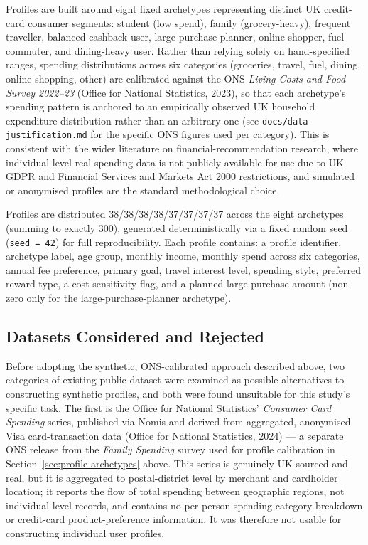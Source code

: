 Profiles are built around eight fixed archetypes representing distinct UK credit-card consumer segments: student (low spend), family (grocery-heavy), frequent traveller, balanced cashback user, large-purchase planner, online shopper, fuel commuter, and dining-heavy user. Rather than relying solely on hand-specified ranges, spending distributions across six categories (groceries, travel, fuel, dining, online shopping, other) are calibrated against the ONS \textit{Living Costs and Food Survey 2022--23} (Office for National Statistics, 2023), so that each archetype's spending pattern is anchored to an empirically observed UK household expenditure distribution rather than an arbitrary one (see \texttt{docs/data-justification.md} for the specific ONS figures used per category). This is consistent with the wider literature on financial-recommendation research, where individual-level real spending data is not publicly available for use due to UK GDPR and Financial Services and Markets Act 2000 restrictions, and simulated or anonymised profiles are the standard methodological choice.

Profiles are distributed 38/38/38/38/37/37/37/37 across the eight archetypes (summing to exactly 300), generated deterministically via a fixed random seed (\texttt{seed = 42}) for full reproducibility. Each profile contains: a profile identifier, archetype label, age group, monthly income, monthly spend across six categories, annual fee preference, primary goal, travel interest level, spending style, preferred reward type, a cost-sensitivity flag, and a planned large-purchase amount (non-zero only for the large-purchase-planner archetype).

\subsection{Datasets Considered and Rejected}
\label{sec:datasets-considered}

Before adopting the synthetic, ONS-calibrated approach described above, two categories of existing public dataset were examined as possible alternatives to constructing synthetic profiles, and both were found unsuitable for this study's specific task. The first is the Office for National Statistics' \textit{Consumer Card Spending} series, published via Nomis and derived from aggregated, anonymised Visa card-transaction data (Office for National Statistics, 2024) --- a separate ONS release from the \textit{Family Spending} survey used for profile calibration in Section~\ref{sec:profile-archetypes} above. This series is genuinely UK-sourced and real, but it is aggregated to postal-district level by merchant and cardholder location; it reports the flow of total spending between geographic regions, not individual-level records, and contains no per-person spending-category breakdown or credit-card product-preference information. It was therefore not usable for constructing individual user profiles.

